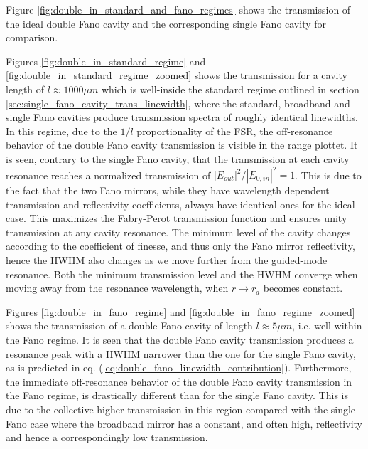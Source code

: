 Figure \ref{fig:double_in_standard_and_fano_regimes} shows the transmission of the ideal double Fano cavity and the corresponding single Fano cavity for comparison. 

Figures \ref{fig:double_in_standard_regime} and \ref{fig:double_in_standard_regime_zoomed} shows the transmission for a cavity length of $l \approx 1000 \mu m$ which is well-inside the standard regime outlined in section \ref{sec:single_fano_cavity_trans_linewidth}, where the standard, broadband and single Fano cavities produce transmission spectra of roughly identical linewidths. In this regime, due to the $1/l$ proportionality of the FSR, the off-resonance behavior of the double Fano cavity transmission is visible in the range plottet. It is seen, contrary to the single Fano cavity, that the transmission at each cavity resonance reaches a normalized transmission of $|E_{out}|^2/|E_{0,in}|^2=1$. This is due to the fact that the two Fano mirrors, while they have wavelength dependent transmission and reflectivity coefficients, always have identical ones for the ideal case. This maximizes the Fabry-Perot transmission function and ensures unity transmission at any cavity resonance. The minimum level of the cavity changes according to the coefficient of finesse, and thus only the Fano mirror reflectivity, hence the HWHM also changes as we move further from the guided-mode resonance. Both the minimum transmission level and the HWHM converge when moving away from the resonance wavelength, when $r \rightarrow r_d$ becomes constant. 

Figures \ref{fig:double_in_fano_regime} and \ref{fig:double_in_fano_regime_zoomed} shows the transmission of a double Fano cavity of length $l \approx 5 \mu m$, i.e. well within the Fano regime. It is seen that the double Fano cavity transmission produces a resonance peak with a HWHM narrower than the one for the single Fano cavity, as is predicted in eq. (\ref{eq:double_fano_linewidth_contribution}). Furthermore, the immediate off-resonance behavior of the double Fano cavity transmission in the Fano regime, is drastically different than for the single Fano cavity. This is due to the collective higher transmission in this region compared with the single Fano case where the broadband mirror has a constant, and often high, reflectivity and hence a correspondingly low transmission.

